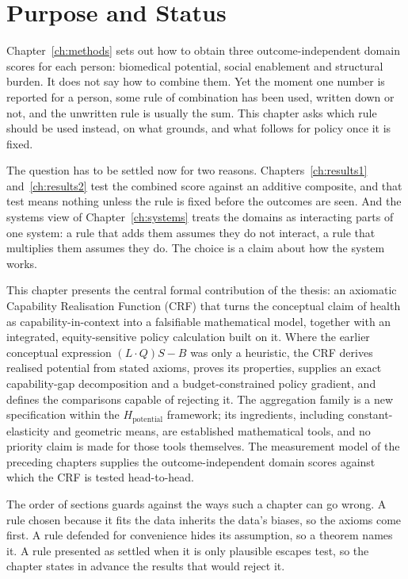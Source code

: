 \section{Purpose and Status}
Chapter~\ref{ch:methods} sets out how to obtain three outcome-independent
domain scores for each person: biomedical potential, social enablement and
structural burden. It does not say how to combine them. Yet the moment one number is reported for a
person, some rule of combination has been used, written down or not, and the
unwritten rule is usually the sum. This chapter asks which rule should be used
instead, on what grounds, and what follows for policy once it is fixed.

The question has to be settled now for two reasons. Chapters~\ref{ch:results1}
and~\ref{ch:results2} test the combined score against an additive composite,
and that test means nothing unless the rule is fixed before the outcomes are
seen. And the systems view of Chapter~\ref{ch:systems} treats the domains as
interacting parts of one system: a rule that adds them assumes they do not
interact, a rule that multiplies them assumes they do. The choice is a claim
about how the system works.

This chapter presents the central formal contribution of the thesis: an axiomatic
Capability Realisation Function (CRF) that turns the conceptual claim of health as
capability-in-context into a falsifiable mathematical model, together with an
integrated, equity-sensitive policy calculation built on it. Where the earlier
conceptual expression $(L\cdot Q)S-B$ was only a heuristic, the CRF derives realised
potential from stated axioms, proves its properties, supplies an exact
capability-gap decomposition and a budget-constrained policy gradient, and defines
the comparisons capable of rejecting it. The aggregation family is a new
specification within the $H_{\text{potential}}$ framework; its ingredients,
including constant-elasticity \citep{arrow_chenery_1961} and geometric means, are established mathematical
tools, and no priority claim is made for those tools themselves. The measurement
model of the preceding chapters supplies the outcome-independent domain scores
against which the CRF is tested head-to-head.

The order of sections guards against the ways such a chapter can go wrong. A
rule chosen because it fits the data inherits the data's biases, so the axioms
come first. A rule defended for convenience hides its assumption, so a theorem
names it. A rule presented as settled when it is only plausible escapes test,
so the chapter states in advance the results that would reject it.

